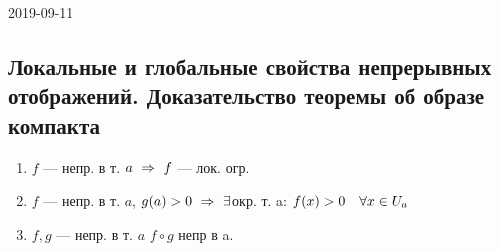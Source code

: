 \documentclass[main]{subfiles}
\begin{document}
\begin{lect}{2019-09-11}
	\subsection{Локальные и глобальные свойства непрерывных отображений. Доказательство теоремы об образе компакта}
	\begin{theorem}
		\begin{enumerate}
			\item $f$ --- непр. в т. $a \ \Rightarrow\  f$ --- лок. огр.
			\item $f$ --- непр. в т. $a$, $g(a) > 0 \ \Rightarrow\  \exists$окр. т. a: $f(x) > 0\quad \forall x \in U_a$
			\item $f, g$ --- непр. в т. $a$ $f \circ g$ непр в a.
		\end{enumerate}
	\end{theorem}
\end{lect}
\end{document}
